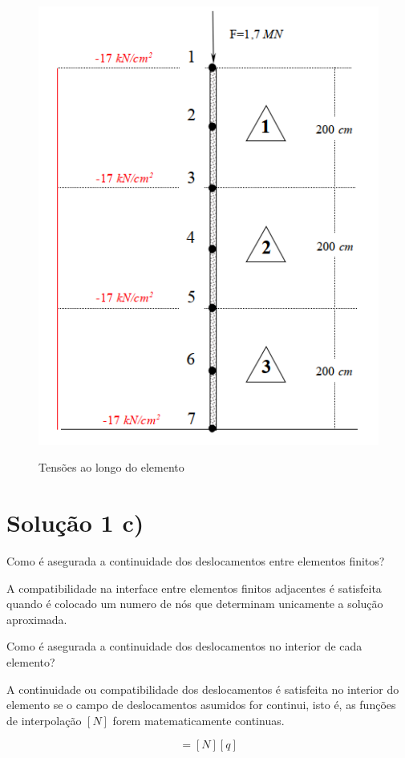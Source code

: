 \documentclass{article} %
\begin{document}
\begin{figure}[H]
	\centering
	\caption{Tensões ao longo do elemento}
	\includegraphics[width=0.5\linewidth]{tensao2}	
	\label{tensoes2}	
\end{figure}


\newpage

\section*{Solução 1 c)}

\vspace{15pt}

Como é asegurada a continuidade dos deslocamentos entre elementos finitos?\\
\vspace{5pt}

\noindent A compatibilidade na interface entre elementos finitos adjacentes é satisfeita quando é colocado um numero de nós que determinam unicamente a solução aproximada. \\
\vspace{1cm}

\noindent Como é asegurada a continuidade dos deslocamentos no interior de cada elemento?

\vspace{10pt}

\noindent A continuidade ou compatibilidade dos deslocamentos é satisfeita no interior do elemento se o campo de deslocamentos asumidos for continui, isto é, as funções de interpolação \([N]\) forem matematicamente continuas.

\begin{equation*}
[v]=[N][q]
\end{equation*}


%
%
\end{document}
